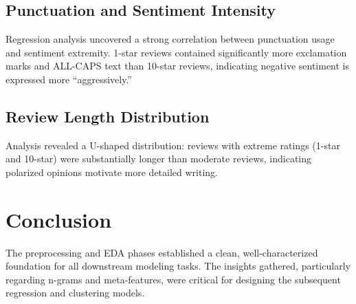 \documentclass[12pt]{article}
\begin{document}
\subsection*{Punctuation and Sentiment Intensity}
Regression analysis uncovered a strong correlation between punctuation usage and sentiment extremity. 1-star reviews contained significantly more exclamation marks and ALL-CAPS text than 10-star reviews, indicating negative sentiment is expressed more ``aggressively.''

\subsection*{Review Length Distribution}
Analysis revealed a U-shaped distribution: reviews with extreme ratings (1-star and 10-star) were substantially longer than moderate reviews, indicating polarized opinions motivate more detailed writing.

\section*{Conclusion}
The preprocessing and EDA phases established a clean, well-characterized foundation for all downstream modeling tasks. The insights gathered, particularly regarding n-grams and meta-features, were critical for designing the subsequent regression and clustering models.
\end{document}
